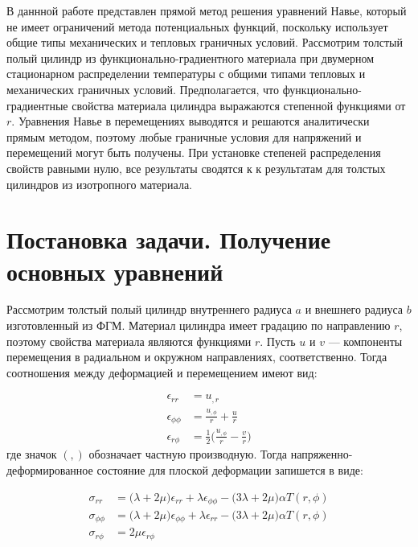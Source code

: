 В даннной работе представлен прямой метод решения уравнений Навье, который не имеет ограничений метода потенциальных функций, поскольку использует общие типы механических и тепловых граничных условий. Рассмотрим толстый полый цилиндр из функционально-градиентного материала при двумерном стационарном распределении температуры с общими типами тепловых и механических граничных условий. Предполагается, что функционально-градиентные свойства материала цилиндра выражаются степенной функциями от \(r\). Уравнения Навье в перемещениях выводятся и решаются аналитически прямым методом, поэтому любые граничные условия для напряжений и перемещений могут быть получены. При установке степеней распределения свойств равными нулю, все результаты сводятся к к результатам для толстых цилиндров из изотропного материала.


\section{Постановка задачи. Получение основных уравнений} \label{ch:ch2/sec2}

Рассмотрим толстый полый цилиндр внутреннего радиуса \(a\) и внешнего радиуса \(b\) изготовленный из ФГМ. Материал цилиндра имеет градацию по направлению \(r\), поэтому свойства материала являются функциями \(r\). Пусть \(u\) и \(v\) --- компоненты перемещения в радиальном и окружном направлениях, соответственно. Тогда соотношения между деформацией и перемещением имеют вид:

\begin{equation}
	\label{eq:ch2:equation1}
	\begin{split}
		\epsilon_{rr} & = u_{,r}\\
		\epsilon_{\phi\phi} &= \frac{u_{,\phi}}{r} + \frac{u}{r}\\
		\epsilon_{r \phi} &= \frac{1}{2} \big(\frac{u_{,\phi}}{r} - \frac{v}{r} \big)
	\end{split}
\end{equation}
где значок \((,)\) обозначает частную производную. Тогда напряженно-деформированное состояние для плоской деформации запишется в виде:

\begin{equation}
	\label{eq:ch2:equation2}
	\begin{split}
		\sigma_{rr} &= \big(\lambda + 2 \mu \big) \epsilon_{rr} + \lambda \epsilon_{\phi\phi} - \big(3 \lambda +2 \mu \big) \alpha T (r, \phi)\\
		\sigma_{\phi\phi} &= \big(\lambda + 2 \mu \big) \epsilon_{\phi \phi} + \lambda \epsilon_{rr} - \big(3 \lambda +2 \mu \big) \alpha T (r, \phi)\\
		\sigma_{r \phi} &= 2\mu \epsilon_{r \phi}
	\end{split}
\end{equation}

